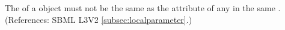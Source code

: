The  of a \LocalParameter object must not be the same as the  attribute of any \SpeciesReference in the same \Reaction.
(References: SBML L3V2 \ref{subsec:localparameter}.)
